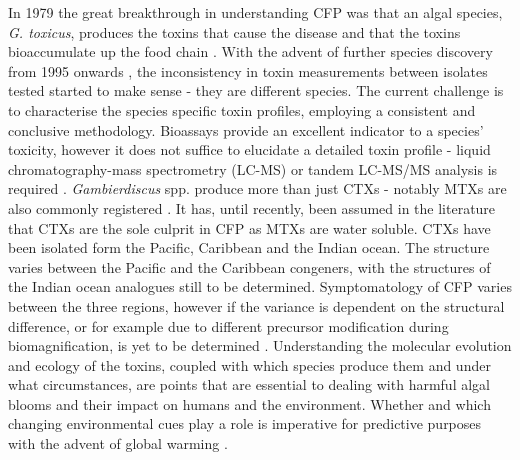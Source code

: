 \documentclass[12pt]{article}
\begin{document}
In 1979 the great breakthrough in understanding CFP was that an algal species, \emph{G. toxicus}, produces the toxins that cause the disease and that the toxins bioaccumulate up the food chain \citep{adachi1979thecal}. With the advent of further species discovery from 1995 onwards \cite{faust1995observation}, the inconsistency in toxin measurements between isolates tested started to make sense - they are different species. The current challenge is to characterise the species specific toxin profiles, employing a consistent and conclusive methodology. Bioassays provide an excellent indicator to a species' toxicity, however it does not suffice to elucidate a detailed toxin profile - liquid chromatography-mass spectrometry (LC-MS) or tandem LC-MS/MS analysis is required \cite{diogened2014chemistry}. \emph{Gambierdiscus} spp. produce more than just CTXs - notably MTXs are also commonly registered \cite{holmes1994purification,murata1993structure}. It has, until recently, been assumed in the literature that CTXs are the sole culprit in CFP as MTXs are water soluble. CTXs have been isolated form the Pacific, Caribbean and the Indian ocean. The  structure varies between the Pacific and the Caribbean congeners, with the structures of the Indian ocean analogues still to be determined. Symptomatology of CFP varies between the three regions, however if the variance is dependent on  the structural difference, or for example due to different precursor modification during biomagnification, is yet to be determined \cite{lewis2006ciguatera}. Understanding the molecular evolution and ecology of the toxins, coupled with which species produce them and under what circumstances, are points that are essential to dealing with harmful algal blooms and their impact on humans and the environment. Whether and which changing environmental cues play a role is imperative for predictive purposes with the advent of global warming \cite{llewellyn2010revisiting}.  \\
\end{document}
